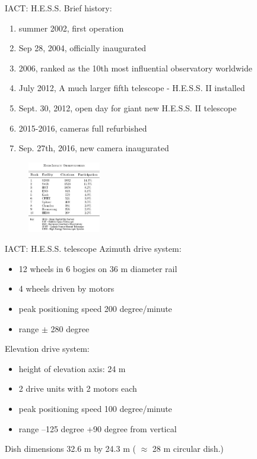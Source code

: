 \documentclass{beamer}
\begin{document}
\begin{frame}{IACT: H.E.S.S.}
	Brief history:
	\begin{enumerate}
		\item summer 2002, first operation
		\item Sep 28, 2004, officially inaugurated
		\item 2006, ranked as the 10th most influential observatory worldwide
		\item July 2012, A much larger fifth telescope - H.E.S.S. II installed
		\item Sept. 30, 2012, open day for giant new H.E.S.S. II telescope
		\item 2015-2016, cameras full refurbished
		\item Sep. 27th, 2016, new camera inaugurated
	\end{enumerate}
	\begin{figure}[h]
		\includegraphics[width=120px]{telescopes-rank.jpg}
	\end{figure}
\end{frame}



\begin{frame}{IACT: H.E.S.S. telescope}
	Azimuth drive system:
	\begin{itemize}
		\item 12 wheels in 6 bogies on 36 m diameter rail
		\item 4 wheels driven by motors
		\item peak positioning speed 200 degree/minute
		\item range $\pm$ 280 degree
	\end{itemize}
	\hfill \break
	Elevation drive system:
	\begin{itemize}
		\item height of elevation axis: 24 m
		\item 2 drive units with 2 motors each
		\item peak positioning speed 100 degree/minute
		\item range –125 degree +90 degree from vertical
	\end{itemize}
	\hfill \break
	Dish dimensions 32.6 m by 24.3 m ( $\approx$ 28 m circular dish.)
\end{frame}
\end{document}
